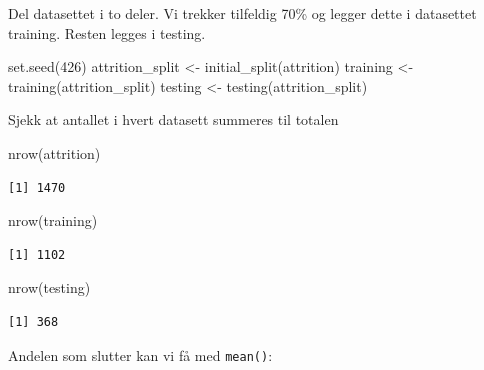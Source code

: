 \documentclass[
  letterpaper,
  DIV=11,
  numbers=noendperiod]{scrreprt}
\newenvironment{Shaded}{\begin{snugshade}}{\end{snugshade}}
\newcommand{\DecValTok}[1]{\textcolor[rgb]{0.68,0.00,0.00}{#1}}
\newcommand{\FunctionTok}[1]{\textcolor[rgb]{0.28,0.35,0.67}{#1}}
\newcommand{\NormalTok}[1]{\textcolor[rgb]{0.00,0.23,0.31}{#1}}
\newcommand{\OtherTok}[1]{\textcolor[rgb]{0.00,0.23,0.31}{#1}}
\newcommand{\SpecialCharTok}[1]{\textcolor[rgb]{0.37,0.37,0.37}{#1}}
\begin{document}
Del datasettet i to deler. Vi trekker tilfeldig 70\% og legger dette i
datasettet training. Resten legges i testing.

\begin{Shaded}
\begin{Highlighting}[]
\FunctionTok{set.seed}\NormalTok{(}\DecValTok{426}\NormalTok{)}
\NormalTok{attrition\_split }\OtherTok{\textless{}{-}} \FunctionTok{initial\_split}\NormalTok{(attrition)}
\NormalTok{training }\OtherTok{\textless{}{-}} \FunctionTok{training}\NormalTok{(attrition\_split)}
\NormalTok{testing  }\OtherTok{\textless{}{-}} \FunctionTok{testing}\NormalTok{(attrition\_split)}
\end{Highlighting}
\end{Shaded}

Sjekk at antallet i hvert datasett summeres til totalen

\begin{Shaded}
\begin{Highlighting}[]
\FunctionTok{nrow}\NormalTok{(attrition)}
\end{Highlighting}
\end{Shaded}

\begin{verbatim}
[1] 1470
\end{verbatim}

\begin{Shaded}
\begin{Highlighting}[]
\FunctionTok{nrow}\NormalTok{(training)}
\end{Highlighting}
\end{Shaded}

\begin{verbatim}
[1] 1102
\end{verbatim}

\begin{Shaded}
\begin{Highlighting}[]
\FunctionTok{nrow}\NormalTok{(testing)}
\end{Highlighting}
\end{Shaded}

\begin{verbatim}
[1] 368
\end{verbatim}

Andelen som slutter kan vi få med \texttt{mean()}:

\begin{Shaded}
\end{Shaded}
\end{document}
